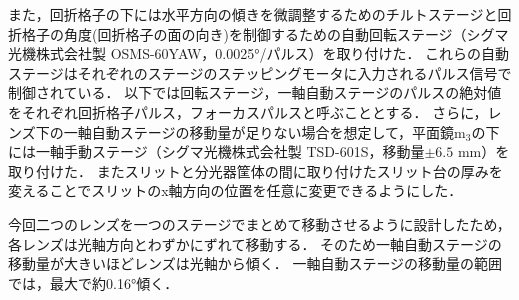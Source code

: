 また，回折格子の下には水平方向の傾きを微調整するためのチルトステージと回折格子の角度(回折格子の面の向き)を制御するための自動回転ステージ（シグマ光機株式会社製 OSMS-60YAW，0.0025°/パルス）を取り付けた．
これらの自動ステージはそれぞれのステージのステッピングモータに入力されるパルス信号で制御されている．
以下では回転ステージ，一軸自動ステージのパルスの絶対値をそれぞれ回折格子パルス，フォーカスパルスと呼ぶこととする．
さらに，レンズ下の一軸自動ステージの移動量が足りない場合を想定して，平面鏡$\mathrm{m_3}$の下には一軸手動ステージ（シグマ光機株式会社製 TSD-601S，移動量$\pm{6.5}$ mm）を取り付けた．
またスリットと分光器筐体の間に取り付けたスリット台の厚みを変えることでスリットのx軸方向の位置を任意に変更できるようにした．



今回二つのレンズを一つのステージでまとめて移動させるように設計したため，各レンズは光軸方向とわずかにずれて移動する．
そのため一軸自動ステージの移動量が大きいほどレンズは光軸から傾く．
一軸自動ステージの移動量の範囲では，最大で約0.16°傾く．

